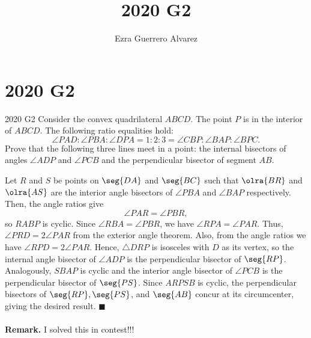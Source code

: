\documentclass[14pt]{article}
\title{2020 G2}
\author{Ezra Guerrero Alvarez}
\begin{document}
\maketitle
	
\section*{2020 G2}

\begin{statement}{2020 G2}
	Consider the convex quadrilateral $ABCD$.
	The point $P$ is in the interior of $ABCD$.
	The following ratio equalities hold:
	\[\angle PAD:\angle PBA:\angle DPA
	= 1:2:3
	= \angle CBP:\angle BAP:\angle BPC.\]
	Prove that the following three lines meet in a point:
	the internal bisectors of angles $\angle ADP$ and $\angle PCB$
	and the perpendicular bisector of segment $AB$.
\end{statement}
Let $R$ and $S$ be points on $\seg{DA}$ and $\seg{BC}$ such that $\olra{BR}$ and $\olra{AS}$ are the interior angle bisectors of $\angle PBA$ and $\angle BAP$ respectively. Then, the angle ratios give
\[ \angle PAR = \angle PBR,  \]
so $RABP$ is cyclic. Since $\angle RBA = \angle PBR$, we have $\angle RPA = \angle PAR$. Thus, $\angle PRD = 2\angle PAR$ from the exterior angle theorem. Also, from the angle ratios we have $\angle RPD = 2\angle PAR$. Hence, $\triangle DRP$ is isosceles with $D$ as its vertex, so the internal angle bisector of $\angle ADP$ is the perpendicular bisector of $\seg{RP}$. Analogously, $SBAP$ is cyclic and the interior angle bisector of $\angle PCB$ is the perpendicular bisector of $\seg{PS}$. Since $ARPSB$ is cyclic, the perpendicular bisectors of $\seg{RP},\seg{PS}$, and $\seg{AB}$ concur at its circumcenter, giving the desired result. $\blacksquare$ \\\\
\textbf{Remark.} I solved this in contest!!!
	
\end{document}
